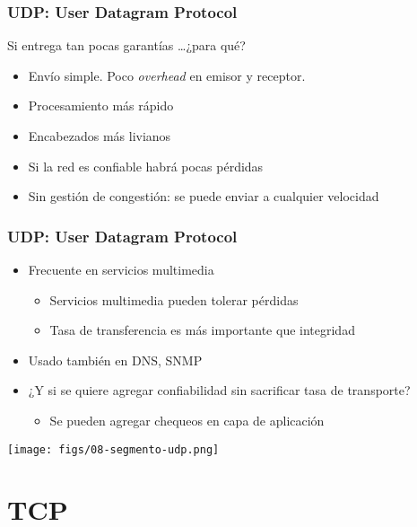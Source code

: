 \documentclass[letter]{beamer}
\begin{document}
\begin{frame}
  \frametitle{UDP: User Datagram Protocol}

  Si entrega tan pocas garantías \ldots ¿para qué?
  \begin{itemize}
    \item Envío simple. Poco {\em overhead} en emisor y receptor.
    \item Procesamiento más rápido
    \item Encabezados más livianos
    \item Si la red es confiable habrá pocas pérdidas
    \item Sin gestión de congestión: se puede enviar a cualquier velocidad
  \end{itemize}

\end{frame}
\begin{frame}
  \frametitle{UDP: User Datagram Protocol}

  \begin{itemize}
    \item Frecuente en servicios multimedia
      \begin{itemize}
        \item Servicios multimedia pueden tolerar pérdidas
        \item Tasa de transferencia es más importante que integridad
      \end{itemize}
    \item Usado también en DNS, SNMP
    \item ¿Y si se quiere agregar confiabilidad sin sacrificar tasa de transporte?
      \begin{itemize}
        \item Se pueden agregar chequeos en capa de aplicación
      \end{itemize}
  \end{itemize}

  \begin{center}
    \texttt{[image: figs/08-segmento-udp.png]}
  \end{center}


\end{frame}

\section{TCP}
\end{document}
